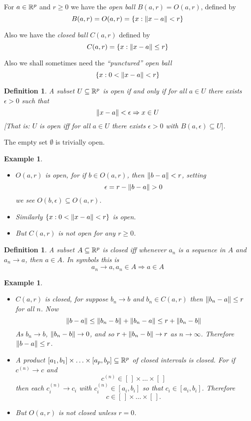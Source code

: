 \documentclass{notes}
\theoremstyle{plain}
\newtheorem{definition}[proposition]{Definition}
\newtheorem{example}[proposition]{Example}
\begin{document}
For $ a \in \mathbb{R}^{p} $ and $ r \geq 0 $ we have the \emph{open 
ball} $ B(a,r) = O(a,r) $, defined by
\[ B(a,r)=O(a,r) = \{ x : \left\|x-a\right\| < r \} \]

Also we have the \emph{closed ball} $ C(a,r) $ defined by
\[ C(a,r) = \{ x : \left\|x-a\right\| \leq r \} \]

Also we shall sometimes need the \emph{``punctured'' open ball}
\[ \{ x: 0 < \left\|x-a\right\| < r \} \]

\begin{definition}
A subset $ U \subseteq \mathbb{R}^{p}  $ is \emph{open} if and only if for 
all $ a \in U $ there exists $ \epsilon > 0 $ such that \[
\left\|x-a\right\| < \epsilon \Rightarrow x \in U \] [That is: $ U $ is open iff 
for all $ a \in U $ there exists $ \epsilon >0 $ with $ 
B(a,\epsilon) \subseteq U] $.
\end{definition}

The empty set $ \emptyset $ is trivially open.

\begin{example}
\

\begin{itemize}
\item $ O(a,r) $ is open, for if $ b \in O(a,r) $, then $ 
\left\|b-a\right\| < r $, setting \[ \epsilon = r - \norm{b-a}>0 \] we see
$O(b, \epsilon) \subseteq O(a,r)$.

\item Similarly  $\{ x: 0 < \left\|x-a\right\|<r \}$ is open.

\item But $ C(a,r) $ is not open for any $ r \geq 0 $.
\end{itemize}
\end{example}

\begin{definition}
A subset $ A \subseteq \mathbb{R}^{p} $ is \emph{closed} iff whenever $ 
a_{n} $ is a sequence in $ A $ and $ a_{n}\to a $, then $ 
a \in A $.  In symbols this is
\[
a_{n} \to a, a_{n} \in A \Rightarrow a \in A 
\]
\end{definition}

\begin{example}
\

\begin{itemize}
\item $ C(a,r) $ is closed, for suppose $ b_{n} \to b $ 
and $ b_{n} \in C(a,r) $ then $\left\|b_{n}-a\right\| \leq r$ for all
$ n $. Now
\[
\left\|b-a\right\| \leq \left\|b_{n}-b\right\|+\left\|b_{n}-a\right\| \le 
r+\left\|b_{n}-b\right\|
\]
As $ b_{n} \to b $, $ \left\|b_{n}-b\right\| \to 0 $, and so
$r + \left\|b_{n}-b\right\| \to r$ as $ n \to \infty $.
Therefore $ \left\|b-a\right\| \leq r $.

\item A product $[a_{1},b_{1}] \times \ldots \times 
[a_{p},b_{p}] \subseteq \mathbb{R}^{p}$ of closed intervals is closed. For 
if $ c^{(n)} \to c $ and \[ c^{(n)} \in [\,] 
\times\ldots\times [\,] \] then each $ c_{i}^{(n)}\to c_{i} $ 
with $c_{i}^{(n)} \in [a_{i},b_{i}]$ so that $c_{i} \in [a_{i}, b_{i}]$.
Therefore 
\[
c \in [\,]\times\ldots\times[\,].
\]

\item But $ O(a,r) $ is not closed unless $ r=0 $.
\end{itemize}
\end{example}
\end{document}
